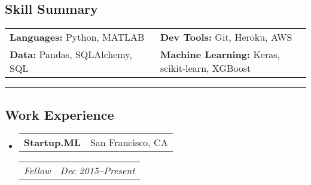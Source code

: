 \documentclass[10pt,letterpaper]{article}
\makeatletter
\newenvironment{indentsection}[1]%
{\begin{list}{}%
	{\setlength{\leftmargin}{#1}}%
	\item[]%
}
{\end{list}}
\newcommand{\headerrow}[2]
{\begin{tabular*}{\linewidth}{l@{\extracolsep{\fill}}r}
	#1 &
	#2 \\
\end{tabular*}}
\makeatother
\begin{document}
\subsection*{Skill Summary}
\begin{indentsection}{\parindent}
\begin{tabular}{p{0.5\linewidth}   p{0.5\linewidth} } 

\textbf{Languages:}  Python, MATLAB 			& \textbf{Dev Tools:}  Git, Heroku, AWS \\  
\textbf{Data:} Pandas, SQLAlchemy, SQL 	& \textbf{Machine Learning:}  Keras, scikit-learn, XGBoost  \\






\end{tabular}
\end{indentsection}


\hrule
\vspace{-0.4em}
\subsection*{Work Experience}
\begin{itemize}
	\parskip=-0.1em
	\item
	\headerrow
		{\textbf{Startup.ML}}
		{San Francisco, CA}
	\headerrow
		{\emph{Fellow}}
		{\emph{Dec 2015--Present}}
\end{itemize}
\end{document}

